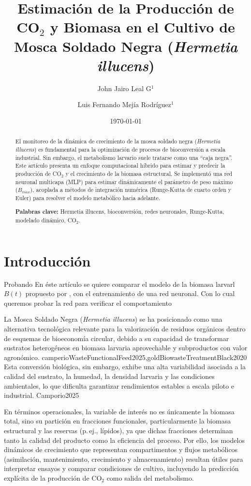 \documentclass[11pt,a4paper]{article}
\title{\textbf{Estimación de la Producción de CO$_2$ y Biomasa en el Cultivo de Mosca Soldado Negra (\textit{Hermetia illucens})}}
\author{John Jairo Leal G$^{1}$ \and Luis Fernando Mejía Rodríguez$^{1}$}
\date{\today}
\begin{document}
\maketitle

\begin{abstract}
El monitoreo de la dinámica de crecimiento de la mosca soldado negra (\textit{Hermetia illucens}) es fundamental para la optimización de procesos de bioconversión a escala industrial. Sin embargo, el metabolismo larvario suele tratarse como una ``caja negra''. Este artículo presenta un enfoque computacional híbrido para estimar y predecir la producción de CO$_2$ y el crecimiento de la biomasa estructural. Se implementó una red neuronal multicapa (MLP) para estimar dinámicamente el parámetro de peso máximo ($B_{max}$), acoplada a métodos de integración numérica (Runge-Kutta de cuarto orden y Euler) para resolver el modelo metabólico hacia adelante.

\textbf{Palabras clave:} Hermetia illucens, bioconversión, redes neuronales, Runge-Kutta, modelado dinámico, CO$_2$.
\end{abstract}

\section{Introducción}

Probando 
En éste artículo se quiere comparar el modelo de la biomasa larvarl $B(t)$ 
propuesto por \parencite{eriksenDynamicModellingFeed2022}, con el entrenamiento de una red neuronal. Con lo cual queremos probar la red para verificar el comportamiento

La Mosca Soldado Negra (\textit{Hermetia illucens}) se ha posicionado como una alternativa tecnológica relevante para la valorización de residuos orgánicos dentro de esquemas de bioeconomía circular, debido a su capacidad de transformar sustratos heterogéneos en biomasa larvaria aprovechable y subproductos con valor agronómico. camperioWasteFunctionalFeed2025,goldBiowasteTreatmentBlack2020 \cite{goldEffectsRearingSystem2022} Esta conversión biológica, sin embargo, exhibe una alta variabilidad asociada a la calidad del sustrato, la humedad, la densidad larvaria y las condiciones ambientales, lo que dificulta garantizar rendimientos estables a escala piloto e industrial. \cite{eriksenDynamicModellingFeed2022} Camporio2025

En términos operacionales, la variable de interés no es únicamente la biomasa total, sino su partición en fracciones funcionales, particularmente la biomasa estructural y las reservas (p.\,ej., lípidos), ya que dichas fracciones determinan tanto la calidad del producto como la eficiencia del proceso. \cite{eriksenDynamicModellingFeed2022} Por ello, los modelos dinámicos de crecimiento que representan compartimentos y flujos metabólicos (asimilación, mantenimiento, crecimiento y almacenamiento) resultan útiles para interpretar ensayos y comparar condiciones de cultivo, incluyendo la predicción explícita de la producción de CO$_2$ como salida del metabolismo. \cite{eriksenDynamicModellingFeed2022}
\end{document}
